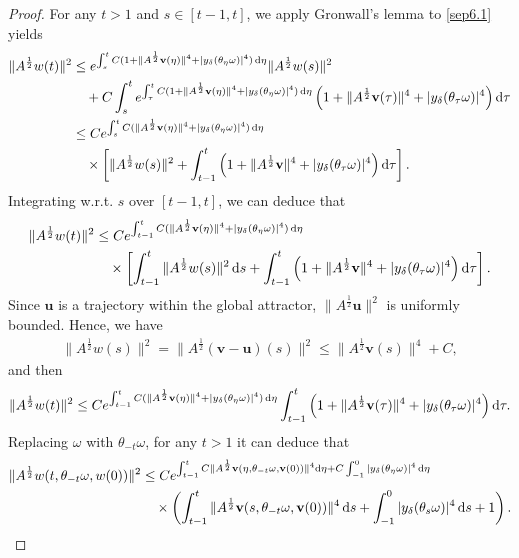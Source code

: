\documentclass{elsarticle}
\theoremstyle{definition}
\numberwithin{equation}{section}
\renewcommand{\d}{{\rm{d}}}
\begin{document}
\begin{proof}
For any $t >1$ and $s\in[t-1,t]$, we apply Gronwall's lemma to \eqref{sep6.1} yields
\begin{align}
\|A^{\frac12}w(t)\|^2&\leq e^{\int_s^tC(1+\|A^{\frac12}\textbf{v}(\eta) \|^4+|y_\delta(\theta_\eta\omega)|^4)\, \d \eta}\|A^{\frac12}w(s)\|^2\nonumber\\
&
 \quad +C\int_s^te^{\int_\tau^tC(1+\|A^{\frac12}\textbf{v}(\eta) \|^4+|y_\delta(\theta_\eta\omega)|^4)\, \d \eta} \left(1+\|A^{\frac12}\textbf{v}(\tau)\|^4+|y_\delta(\theta_\tau\omega)|^4 \right) \d \tau\nonumber\\
&\leq Ce^{\int_s^tC(\|A^{\frac12}\textbf{v}(\eta) \|^4+|y_\delta(\theta_\eta\omega)|^4)\, \d \eta} \nonumber  \\
&\quad \times
 \left[\|A^{\frac12}w(s)\|^2
+\int_{t-1}^t    \left(1+\|A^{\frac12}\textbf{v}\|^4+|y_\delta(\theta_\tau\omega)|^4\right) \d \tau \right]. \nonumber
\end{align}
Integrating w.r.t$.$  $s$ over $[t-1,t]$, we can deduce that
\begin{align*}
\|A^{\frac12}w(t)\|^2
&\leq Ce^{\int_{t-1}^tC(\|A^{\frac12}\textbf{v}(\eta)\|^4+|y_\delta(\theta_\eta\omega)|^4)\, \d \eta}\nonumber\\
&\quad \times \left[\int_{t-1}^t\|A^{\frac12}w(s)\|^2\, \d s
+\int_{t-1}^t  \left(1+\|A^{\frac12}\textbf{v}\|^4+|y_\delta(\theta_\tau \omega)|^4\right) \d \tau\right]. \nonumber
\end{align*}
   Since $\textbf{u}$ is a trajectory within the global attractor, $\|A^{\frac 12} \textbf{u}\|^2$ is uniformly bounded. Hence, we have
\begin{align*}
\|A^{\frac 12} w(s)\|^2
 =\|A^{\frac 12} (\textbf{v}-\textbf{u}) (s)\|^2
  \leq \|A^{\frac 12} \textbf{v} (s)\|^4 + C,
\end{align*}
and then
\begin{align*}
\|A^{\frac12}w(t)\|^2
 \leq Ce^{\int_{t-1}^tC(\|A^{\frac12}\textbf{v}(\eta)\|^4+|y_\delta(\theta_\eta\omega)|^4)\, \d \eta}  \int_{t-1}^t  \left(1+\|A^{\frac12}\textbf{v}(\tau)\|^4+|y_\delta(\theta_\tau\omega)|^4 \right)\d \tau .
\end{align*}
Replacing $\omega$ with $\theta_{-t}\omega$, for any $t>1$  it can deduce that
\begin{align}\label{4.14}
  \|A^{\frac12}w(t,\theta_{-t}\omega,w(0))\|^2
&\leq Ce^{\int_{t-1}^tC \|A^{\frac12}\textbf{v}(\eta,\theta_{-t}\omega,\textbf{v}(0))\|^4 \d \eta+  C\int_{-1}^0|y_\delta(\theta_{\eta}\omega)|^4 \, \d \eta}  \nonumber\\
 &\quad
 \times \left(\int_{t-1}^t  \|A^{\frac12}\textbf{v}(s,\theta_{-t}\omega,\textbf{v}(0))\|^4 \, \d s + \int_{-1}^0  |y_\delta(\theta_{s}\omega)|^4 \, \d s +1 \right) .
\end{align}


\end{proof}
\end{document}

